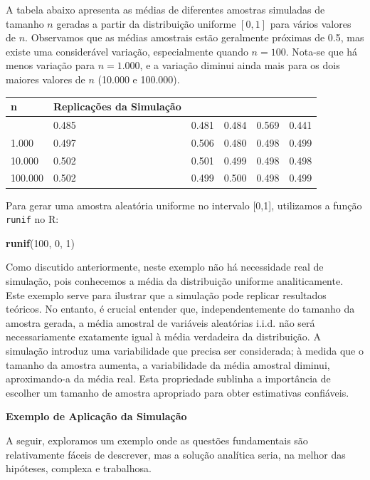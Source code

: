 \documentclass[
]{book}
\newenvironment{Shaded}{\begin{snugshade}}{\end{snugshade}}
\newcommand{\DecValTok}[1]{\textcolor[rgb]{0.00,0.00,0.81}{#1}}
\newcommand{\FunctionTok}[1]{\textcolor[rgb]{0.13,0.29,0.53}{\textbf{#1}}}
\newcommand{\NormalTok}[1]{#1}
\begin{document}
A tabela abaixo apresenta as médias de diferentes amostras simuladas de
tamanho \(n\) geradas a partir da distribuição uniforme \([0,1]\) para
vários valores de \(n\). Observamos que as médias amostrais estão
geralmente próximas de 0.5, mas existe uma considerável variação,
especialmente quando \(n = 100\). Nota-se que há menos variação para
\(n = 1.000\), e a variação diminui ainda mais para os dois maiores
valores de \(n\) (10.000 e 100.000).

\begin{longtable}[]{@{}llllll@{}}
\toprule\noalign{}
n & Replicações da Simulação & & & & \\
\midrule\noalign{}
\endhead
\bottomrule\noalign{}
\endlastfoot
100 & 0.485 & 0.481 & 0.484 & 0.569 & 0.441 \\
1.000 & 0.497 & 0.506 & 0.480 & 0.498 & 0.499 \\
10.000 & 0.502 & 0.501 & 0.499 & 0.498 & 0.498 \\
100.000 & 0.502 & 0.499 & 0.500 & 0.498 & 0.499 \\
\end{longtable}

Para gerar uma amostra aleatória uniforme no intervalo {[}0,1{]}, utilizamos
a função \texttt{runif} no R:

\begin{Shaded}
\begin{Highlighting}[]
\FunctionTok{runif}\NormalTok{(}\DecValTok{100}\NormalTok{, }\DecValTok{0}\NormalTok{, }\DecValTok{1}\NormalTok{)}
\end{Highlighting}
\end{Shaded}

Como discutido anteriormente, neste exemplo não há necessidade real de
simulação, pois conhecemos a média da distribuição uniforme
analiticamente. Este exemplo serve para ilustrar que a simulação pode
replicar resultados teóricos. No entanto, é crucial entender que,
independentemente do tamanho da amostra gerada, a média amostral de
variáveis aleatórias i.i.d. não será necessariamente exatamente igual à
média verdadeira da distribuição. A simulação introduz uma variabilidade
que precisa ser considerada; à medida que o tamanho da amostra aumenta,
a variabilidade da média amostral diminui, aproximando-a da média real.
Esta propriedade sublinha a importância de escolher um tamanho de
amostra apropriado para obter estimativas confiáveis.

\textbf{Exemplo de Aplicação da Simulação}

A seguir, exploramos um exemplo onde as questões fundamentais são
relativamente fáceis de descrever, mas a solução analítica seria, na
melhor das hipóteses, complexa e trabalhosa.
\end{document}

